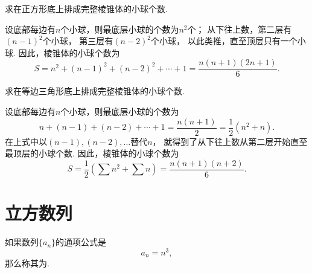 \begin{example}
求在正方形底上排成完整棱锥体的小球个数.
\begin{solution}
设底部每边有\(n\)个小球，则最底层小球的个数为\(n^2\)个；
从下往上数，第二层有\((n-1)^2\)个小球，
第三层有\((n-2)^2\)个小球，
以此类推，直至顶层只有一个小球.
因此，棱锥体的小球个数为\begin{equation*}
    S = n^2+(n-1)^2+(n-2)^2+\dotsb+1
    = \frac{n(n+1)(2n+1)}{6}.
\end{equation*}
\end{solution}
\end{example}

\begin{example}
求在等边三角形底上排成完整棱锥体的小球个数.
\begin{solution}
设底部每边有\(n\)个小球，则最底层小球的个数为\begin{equation*}
    n+(n-1)+(n-2)+\dotsb+1
    = \frac{n(n+1)}{2}
    = \frac{1}{2}(n^2+n).
\end{equation*}
在上式中以\((n-1),(n-2),\dotsc\)替代\(n\)，
就得到了从下往上数从第二层开始直至最顶层的小球个数.
因此，棱锥体的小球个数为\begin{equation*}
    S = \frac{1}{2} (\sum n^2 + \sum n)
    = \frac{n(n+1)(n+2)}{6}.
\end{equation*}
\end{solution}
\end{example}

\section{立方数列}
如果数列\(\{a_n\}\)的通项公式是\begin{equation*}
a_n = n^3,
\end{equation*}那么称其为.

